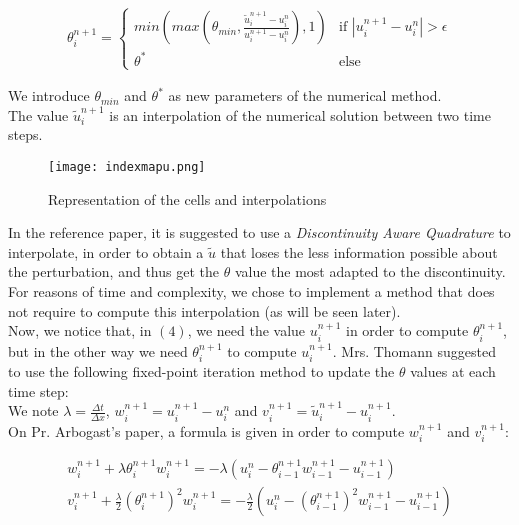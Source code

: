 \documentclass[12pt]{article}
\begin{document}
\begin{align*}
    \theta_i^{n+1} = \begin{cases}
        min(max(\theta_{min}, \frac{\tilde{u}_i^{n+1} - u_i^n}{u_i^{n+1} - u_i^n} ), 1) & \text{if } |u_i^{n+1} - u_i^n| > \epsilon \tag{4} \\
        \theta^* & \text{else} 
    \end{cases}
\end{align*}

We introduce $\theta_{min}$ and $\theta^*$ as new parameters of the numerical method.\\
The value $\tilde{u}_i^{n+1}$ is an interpolation of the numerical solution between two time steps.\\

\begin{figure}[H]
    \centering
    \texttt{[image: indexmapu.png]}
    \caption{Representation of the cells and interpolations}
\end{figure}
In the reference paper, it is suggested to use a \textit{Discontinuity Aware Quadrature} to interpolate, in order to obtain a $\tilde{u}$
that loses the less information possible about the perturbation, and thus get the $\theta$ value the most adapted to the discontinuity.
For reasons of time and complexity, we chose to implement a method that does not require to compute this interpolation (as will be seen later).\\

Now, we notice that, in $(4)$, we need the value $u_i^{n+1}$ in order to compute $\theta_i^{n+1}$,
but in the other way we need $\theta_i^{n+1}$ to compute $u_i^{n+1}$.
Mrs. Thomann suggested to use the following fixed-point iteration method to update the $\theta$ values at each time step:\\
We note $\lambda = \frac{\Delta t}{\Delta x}$, $w_i^{n+1} = u_i^{n+1} - u_i^{n}$ and $v_i^{n+1} = \tilde{u}_i^{n+1} - u_i^{n+1}$.\\
On Pr. Arbogast's paper, a formula is given in order to compute $w_i^{n+1}$ and $v_i^{n+1}$:

\begin{align*}
    w_i^{n+1} + \lambda \theta_i^{n+1} w_i^{n+1} = -\lambda(u_i^n - \theta_{i-1}^{n+1} w_{i-1}^{n+1} - u_{i-1}^{n+1}) \tag{5a}\\
    v_i^{n+1} + \frac{\lambda}{2} (\theta_i^{n+1})^2 w_i^{n+1} = -\frac{\lambda}{2} (u_i^n - (\theta_{i-1}^{n+1})^2 w_{i-1}^{n+1} - u_{i-1}^{n+1}) \tag{5b}
\end{align*}
\end{document}
